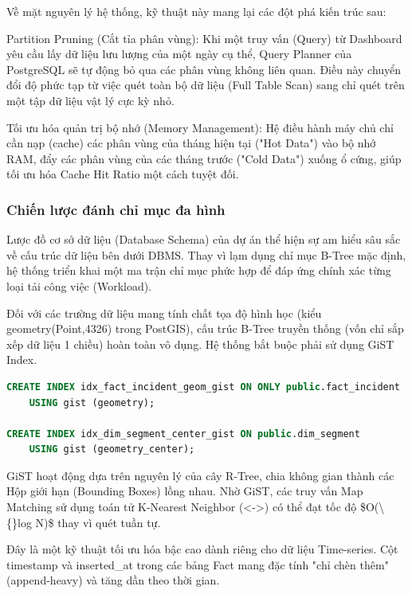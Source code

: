 Về mặt nguyên lý hệ thống, kỹ thuật này mang lại các đột phá kiến trúc sau:


Partition Pruning (Cắt tỉa phân vùng): Khi một truy vấn (Query) từ Dashboard yêu cầu lấy dữ liệu lưu lượng của một ngày cụ thể, Query Planner của PostgreSQL sẽ tự động bỏ qua các phân vùng không liên quan. Điều này chuyển đổi độ phức tạp từ việc quét toàn bộ dữ liệu (Full Table Scan) sang chỉ quét trên một tập dữ liệu vật lý cực kỳ nhỏ.


Tối ưu hóa quản trị bộ nhớ (Memory Management): Hệ điều hành máy chủ chỉ cần nạp (cache) các phân vùng của tháng hiện tại ("Hot Data") vào bộ nhớ RAM, đẩy các phân vùng của các tháng trước ("Cold Data") xuống ổ cứng, giúp tối ưu hóa Cache Hit Ratio một cách tuyệt đối.


\subsubsection{Chiến lược đánh chỉ mục đa hình}
Lược đồ cơ sở dữ liệu (Database Schema) của dự án thể hiện sự am hiểu sâu sắc về cấu trúc dữ liệu bên dưới DBMS. Thay vì lạm dụng chỉ mục B-Tree mặc định, hệ thống triển khai một ma trận chỉ mục phức hợp để đáp ứng chính xác từng loại tải công việc (Workload).


Đối với các trường dữ liệu mang tính chất tọa độ hình học (kiểu geometry(Point,4326) trong PostGIS), cấu trúc B-Tree truyền thống (vốn chỉ sắp xếp dữ liệu 1 chiều) hoàn toàn vô dụng. Hệ thống bắt buộc phải sử dụng GiST Index.


\begin{lstlisting}[language=SQL]
CREATE INDEX idx_fact_incident_geom_gist ON ONLY public.fact_incident
    USING gist (geometry);

CREATE INDEX idx_dim_segment_center_gist ON public.dim_segment
    USING gist (geometry_center);
\end{lstlisting}

GiST hoạt động dựa trên nguyên lý của cây R-Tree, chia không gian thành các Hộp giới hạn (Bounding Boxes) lồng nhau. Nhờ GiST, các truy vấn Map Matching sử dụng toán tử K-Nearest Neighbor (<->) có thể đạt tốc độ \$O(\textbackslash\{\}log N)\$ thay vì quét tuần tự.


Đây là một kỹ thuật tối ưu hóa bậc cao dành riêng cho dữ liệu Time-series. Cột timestamp và inserted\_at trong các bảng Fact mang đặc tính "chỉ chèn thêm" (append-heavy) và tăng dần theo thời gian.



